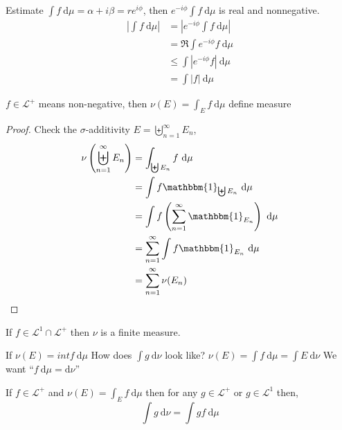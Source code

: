\begin{remark}
  Estimate $\int f \ \mathrm{d}\mu = \alpha + i\beta = re^{i \phi}$, then
  $e^{-i\phi} \int f \ \mathrm{d}\mu$ is real and nonnegative.
  \begin{align*}
    \left|\int f \ \mathrm{d}\mu\right| &= \left|e^{-i\phi} \int f \ \mathrm{d}\mu\right| \\
    &= \Re \int e^{-i\phi}f \ \mathrm{d}\mu \\
    &\le \int |e^{-i\phi}f| \ \mathrm{d}\mu \\
    &= \int |f| \ \mathrm{d}\mu
  \end{align*}
\end{remark}

\begin{lemma}
$f \in \mathcal{L}^+$ means non-negative, then $\nu(E) = \int_E f \ \mathrm{d}\mu$ define measure
\end{lemma}

\begin{proof}
Check the $\sigma$-additivity
$E = \biguplus_{n=1}^\infty E_n$, 
\begin{align*}
  \nu\left(\biguplus_{n=1}^\infty E_n\right) &= \int_{\biguplus E_n} f \ \mathrm{d}\mu \\
  &= \int f \mathbbm{1}_{\biguplus E_n} \ \mathrm{d}\mu \\
  &= \int f \left(\sum_{n=1}^\infty \mathbbm{1}_{E_n}\right) \ \mathrm{d}\mu \\
  &= \sum_{n=1}^\infty \int f \mathbbm{1}_{E_n} \ \mathrm{d}\mu \\
  &= \sum_{n=1}^\infty \nu(E_n)
\end{align*}
\end{proof}

\begin{claim}
  If $f \in \mathcal{L}^1 \cap \mathcal{L}^+$ then $\nu$ is a finite measure.
\end{claim}

If $\nu(E) = int f  \ \mathrm{d}\mu$
How does $\int g \ \mathrm{d}\nu$ look like?
$\nu(E) = \int f \ \mathrm{d}\mu = \int E \ \mathrm{d}\nu$
We want ``$f\ \mathrm{d}\mu = \mathrm{d}\nu$''
\begin{lemma}
  If $f \in \mathcal{L}^+$ and $\nu(E) = \int_E f \ \mathrm{d}\mu$ then for any $g \in \mathcal{L}^+$ or $g \in \mathcal{L}^1$ then,   
  \[\int g\ \mathrm{d}\nu = \int g f \ \mathrm{d}\mu\]
\end{lemma}

